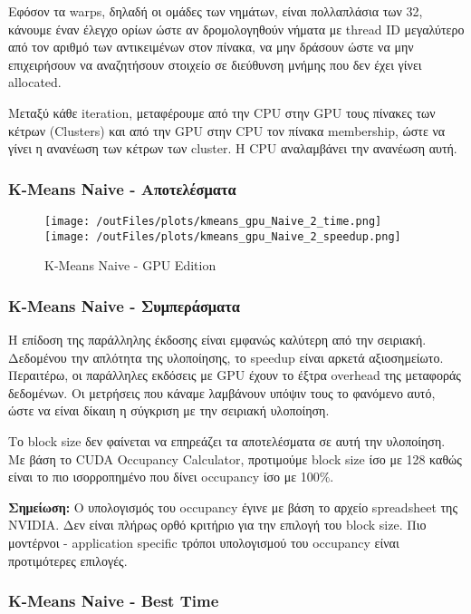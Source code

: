 \documentclass[../final_report.tex]{subfiles}
\begin{document}
Εφόσον τα warps, δηλαδή οι ομάδες των νημάτων, είναι πολλαπλάσια των 32, κάνουμε έναν έλεγχο ορίων ώστε αν δρομολογηθούν νήματα με 
thread ID μεγαλύτερο από τον αριθμό των αντικειμένων στον πίνακα, να μην δράσουν ώστε να μην επιχειρήσουν να αναζητήσουν στοιχείο σε 
διεύθυνση μνήμης που δεν έχει γίνει allocated.

Μεταξύ κάθε iteration, μεταφέρουμε από την CPU στην GPU τους πίνακες των κέτρων (Clusters) και από την GPU στην CPU τον πίνακα
membership, ώστε να γίνει η ανανέωση των κέτρων των cluster. Η CPU αναλαμβάνει την ανανέωση αυτή.

\subsubsection*{K-Means Naive - Αποτελέσματα}

\begin{figure}[H]
    \centering
    \texttt{[image: /outFiles/plots/kmeans\_gpu\_Naive\_2\_time.png]}
    \texttt{[image: /outFiles/plots/kmeans\_gpu\_Naive\_2\_speedup.png]}
    \caption{K-Means Naive - GPU Edition}
    \label{fig:K-Means Naive - GPU Edition}
\end{figure}

\subsubsection*{K-Means Naive - Συμπεράσματα}

Η επίδοση της παράλληλης έκδοσης είναι εμφανώς καλύτερη από την σειριακή. Δεδομένου την απλότητα της υλοποίησης, το speedup
είναι αρκετά αξιοσημείωτο. Περαιτέρω, οι παράλληλες εκδόσεις με GPU έχουν το έξτρα overhead της μεταφοράς δεδομένων. Οι μετρήσεις
που κάναμε λαμβάνουν υπόψιν τους το φανόμενο αυτό, ώστε να είναι δίκαιη η σύγκριση με την σειριακή υλοποίηση.

Το block size δεν φαίνεται να επηρεάζει τα αποτελέσματα σε αυτή την υλοποίηση. Με βάση το CUDA Occupancy Calculator, προτιμούμε block size
ίσο με 128 καθώς είναι το πιο ισορροπημένο που δίνει occupancy ίσο με 100\%.

\textbf{Σημείωση:} Ο υπολογισμός του occupancy έγινε με βάση το αρχείο spreadsheet της NVIDIA. Δεν είναι πλήρως ορθό κριτήριο
για την επιλογή του block size. Πιο μοντέρνοι - application specific τρόποι υπολογισμού του occupancy είναι προτιμότερες επιλογές.

\subsubsection*{K-Means Naive - Best Time}
\end{document}
